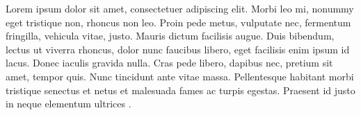 \documentclass[a4paper,10pt,openany,oneside,english]{sphinxmanual}
\begin{document}
\sphinxAtStartPar
Lorem ipsum dolor sit amet, consectetuer adipiscing elit. Morbi leo mi, nonummy eget tristique non, rhoncus non leo.
Proin pede metus, vulputate nec, fermentum fringilla, vehicula vitae, justo. Mauris dictum facilisis augue. Duis bibendum,
lectus ut viverra rhoncus, dolor nunc faucibus libero, eget facilisis enim ipsum id lacus. Donec iaculis gravida nulla.
Cras pede libero, dapibus nec, pretium sit amet, tempor quis. Nunc tincidunt ante vitae massa. Pellentesque habitant
morbi tristique senectus et netus et malesuada fames ac turpis egestas.
Praesent id justo in neque elementum ultrices \sphinxfootnotemark[1].

\sphinxAtStartPar




\renewcommand{\indexname}{Index}
\printindex
\end{document}
